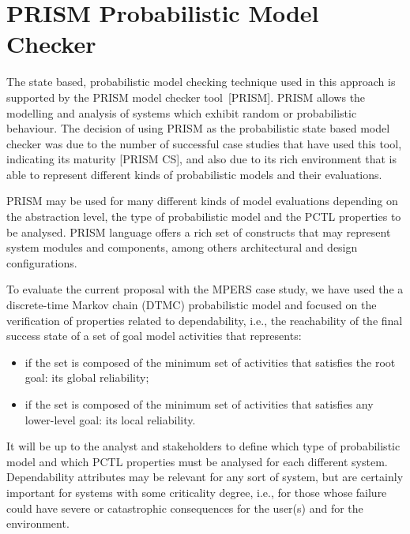 \section{PRISM Probabilistic Model Checker}

The state based, probabilistic model checking technique used in this approach is supported by the PRISM model checker tool~[PRISM]. PRISM allows the modelling and analysis of systems which exhibit random or probabilistic behaviour. The decision of using PRISM as the probabilistic state based model checker was due to the number of successful case studies that have used this tool, indicating its maturity [PRISM CS], and also due to its rich environment that is able to represent different kinds of probabilistic models and their evaluations.

PRISM may be used for many different kinds of model evaluations depending on the abstraction level, the type of probabilistic model and the PCTL properties to be analysed. PRISM language offers a rich set of constructs that may represent system modules and components, among others architectural and design configurations. 

To evaluate the current proposal with the MPERS case study, we have used the a discrete-time Markov chain (DTMC) probabilistic model and focused on the verification of properties related to dependability, i.e., the reachability of the final success state of a set of goal model activities that represents: 

\begin{itemize}

\item if the set is composed of the minimum set of activities that satisfies the root goal: its global reliability;  

\item if the set is composed of the minimum set of activities that satisfies any lower-level goal: its local reliability.

\end{itemize}

It will be up to the analyst and stakeholders to define which type of probabilistic model and which PCTL properties must be analysed for each different system. Dependability attributes may be relevant for any sort of system, but are certainly important for systems with some criticality degree, i.e., for those whose failure could have severe or catastrophic consequences for the user(s) and for the environment.
